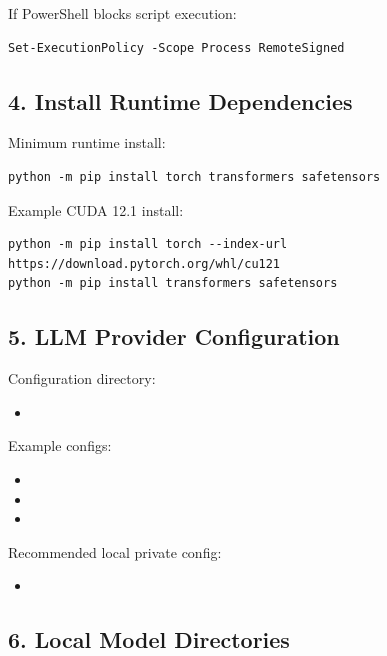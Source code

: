 \documentclass[11pt,a4paper]{ctexart}
\begin{document}
If PowerShell blocks script execution:

\begin{verbatim}
Set-ExecutionPolicy -Scope Process RemoteSigned
\end{verbatim}

\subsection*{4. Install Runtime Dependencies}

Minimum runtime install:

\begin{verbatim}
python -m pip install torch transformers safetensors
\end{verbatim}

Example CUDA 12.1 install:

\begin{verbatim}
python -m pip install torch --index-url https://download.pytorch.org/whl/cu121
python -m pip install transformers safetensors
\end{verbatim}

\subsection*{5. LLM Provider Configuration}

Configuration directory:

\begin{itemize}
\item {}
\end{itemize}

Example configs:

\begin{itemize}
\item {}
\item {}
\item {}
\end{itemize}

Recommended local private config:

\begin{itemize}
\item {}
\end{itemize}

\subsection*{6. Local Model Directories}
\end{document}
